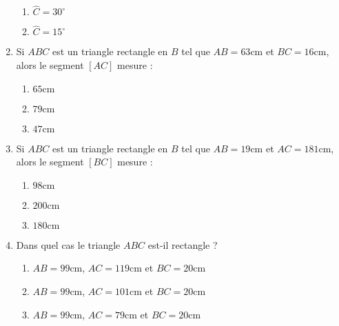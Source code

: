 \documentclass[oneside,twoside]{book}
\begin{document}
\begin{enumerate}
\begin{enumerate}
\item\MauvaiseReponse $\widehat{C}=30^{\circ}$

\item\BonneReponse $\widehat{C}=15^{\circ}$

\end{enumerate}



\item Si $ABC$ est un triangle rectangle en $B$ tel que $AB=63\mathrm{cm}$ et $BC=16\mathrm{cm}$, alors le segment $\left[AC\right]$ mesure :

\begin{enumerate}

\item\BonneReponse $65\mathrm{cm}$

\item\MauvaiseReponse $79\mathrm{cm}$

\item\MauvaiseReponse $47\mathrm{cm}$

\end{enumerate}



\item Si $ABC$ est un triangle rectangle en $B$ tel que $AB=19\mathrm{cm}$ et $AC=181\mathrm{cm}$, alors le segment $\left[BC\right]$ mesure :

\begin{enumerate}


\item\MauvaiseReponse $98\mathrm{cm}$

\item\MauvaiseReponse $200\mathrm{cm}$
\item\BonneReponse $180\mathrm{cm}$

\end{enumerate}



\item Dans quel cas le triangle $ABC$ est-il rectangle ?

\begin{enumerate}


\item\MauvaiseReponse $AB=99\mathrm{cm}$, $AC=119\mathrm{cm}$ et $BC=20\mathrm{cm}$
\item\BonneReponse $AB=99\mathrm{cm}$, $AC=101\mathrm{cm}$ et $BC=20\mathrm{cm}$

\item\MauvaiseReponse $AB=99\mathrm{cm}$, $AC=79\mathrm{cm}$ et $BC=20\mathrm{cm}$


\end{enumerate}
\end{enumerate}
\end{document}
